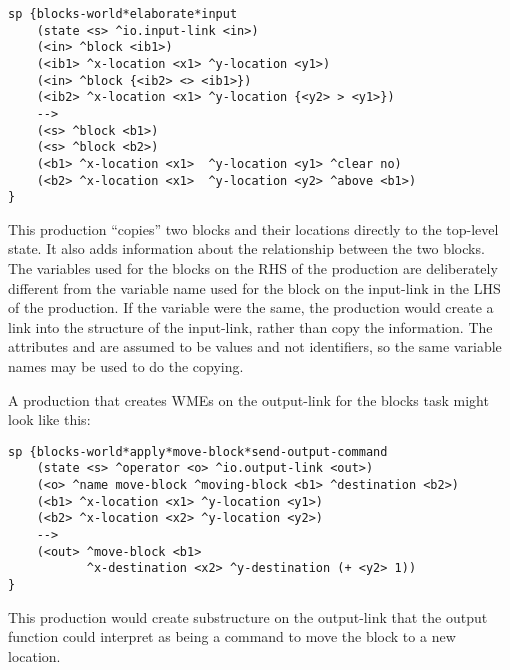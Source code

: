 \begin{verbatim}
sp {blocks-world*elaborate*input
    (state <s> ^io.input-link <in>)
    (<in> ^block <ib1>)
    (<ib1> ^x-location <x1> ^y-location <y1>)
    (<in> ^block {<ib2> <> <ib1>})
    (<ib2> ^x-location <x1> ^y-location {<y2> > <y1>})
    -->
    (<s> ^block <b1>)
    (<s> ^block <b2>)
    (<b1> ^x-location <x1>  ^y-location <y1> ^clear no)
    (<b2> ^x-location <x1>  ^y-location <y2> ^above <b1>)
}
\end{verbatim}
\vspace{12pt}

This production ``copies'' two blocks and their locations directly to the top-level state.
It also adds information about the relationship between the two blocks.  The variables used for the blocks on the RHS of the production are deliberately different from the variable name used for the block on the input-link in the LHS of the production. If the variable were the same, the production would create a link into the structure of the input-link, rather than copy the information. The attributes  and  are assumed to be values and not identifiers, so the same variable names may be used to do the copying.

A production that creates WMEs on the output-link for the blocks task might look like this:

\begin{verbatim}
sp {blocks-world*apply*move-block*send-output-command
    (state <s> ^operator <o> ^io.output-link <out>)
    (<o> ^name move-block ^moving-block <b1> ^destination <b2>)
    (<b1> ^x-location <x1> ^y-location <y1>)
    (<b2> ^x-location <x2> ^y-location <y2>)
    -->
    (<out> ^move-block <b1>
           ^x-destination <x2> ^y-destination (+ <y2> 1))
}
\end{verbatim}
\vspace{12pt}

This production would create substructure on the output-link that the output function could interpret as being a command to move the block to a new location.


